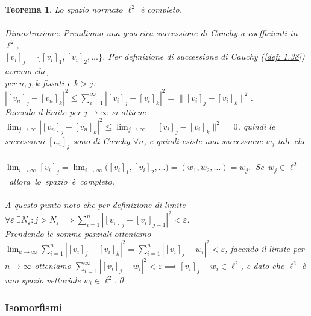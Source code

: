 \documentclass[a4paper,12pt]{report}
\newtheorem{teorema}{Teorema}[chapter]
\newcommand{\lt}{<}
\newcommand{\gt}{>}
\begin{document}
\begin{teorema}
    Lo spazio normato $\ell^2$ è completo.
    \\
    \\ \underline{Dimostrazione}:  Prendiamo una generica successione di Cauchy a coefficienti in $\ell^2$, 
    \\$[v_i]_j=\{[v_i]_1,[v_i]_2,...\}$. Per definizione di successione di Cauchy (\ref{def: 1.38}) avremo che,
    \\per $n,j,k$ fissati e $k\gt j$: $|[v_n]_j-[v_n]_{k}|^2\leq \displaystyle\sum_{i=1}^\infty|[v_i]_j-[v_i]_{k}|^2=\|[v_i]_j-[v_i]_{k}\|^2$.
    \\ Facendo il limite per $j\to\infty$ si ottiene $\displaystyle\lim_{j\to\infty}|[v_n]_j-[v_n]_{k}|^2\leq\lim_{j\to\infty}\|[v_i]_j-[v_i]_{k}\|^2=0$, quindi le successioni $[v_n]_j$ sono di Cauchy $\forall n$, e quindi 
    esiste una successione $ w_j$ tale che 
    \\
    \\ \mbox{$\displaystyle\lim_{i\to\infty}[v_i]_j=\lim_{i\to\infty}\big([v_i]_1,[v_i]_2,...\big)=(w_1,w_2,...)=w_j$. Se $w_j\in \ell^2$ allora lo spazio è completo.}
    \\
    \\ A questo punto noto che per definizione di limite \mbox{$\forall \varepsilon \ \exists  N_{\varepsilon}:j\gt N_\varepsilon \implies\displaystyle\sum_{i=1}^{n}|[v_i]_j-[v_i]_{j+1}|^2\lt \varepsilon$}.
    \\ Prendendo le somme parziali otteniamo $\displaystyle\lim_{k\to\infty}\sum_{i=1}^n|[v_i]_j-[v_i]_k|^2=\sum_{i=1}^n|[v_i]_j-w_i|^2\lt\varepsilon $, facendo il limite per $n\to\infty $ otteniamo $\displaystyle\sum_{i=1}^\infty |[v_i]_j-w_i|^2\lt \varepsilon \implies  [v_i]_j-w_i\in \ell^2$, e dato che $\ell^2$ è uno spazio vettoriale $w_i\in \ell^2$.\qed
\end{teorema}

\subsubsection{Isomorfismi}
\end{document}
